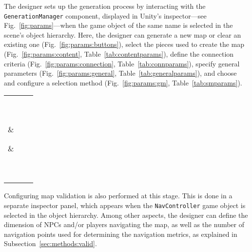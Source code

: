 \documentclass[journal]{IEEEtran}
\begin{document}
The designer sets up the generation process by interacting with the \texttt{GenerationManager}
component, displayed in Unity's inspector---see Fig.~\ref{fig:params}---when the game object of
the same name is selected in the scene's object hierarchy. Here, the designer can generate a new
map or clear an existing one (Fig.~\ref{fig:params:buttons}), select the pieces used to create
the map (Fig.~\ref{fig:params:content}, Table~\ref{tab:contentparams}), define the connection
criteria (Fig.~\ref{fig:params:connection}, Table~\ref{tab:connparams}), specify general
parameters (Fig.~\ref{fig:params:general}, Table~\ref{tab:generalparams}), and choose and
configure a selection method (Fig.~\ref{fig:params:gm}, Table~\ref{tab:smparams}).

\begin{figure*}[!t]
  \centering
  \begingroup
  \setlength{\tabcolsep}{1.5pt}
  \begin{tabular}{ccc}

   \parbox[c][][t]{0.326\textwidth}{
   \\
   }
   &
   \parbox[c][][t]{0.326\textwidth}{
   }
   &
   \parbox[c][][t]{0.326\textwidth}{
   \\
   }
  \end{tabular}
 \caption{The map generation parameters and control buttons, part of the
 \texttt{GenerationManager} component, as shown in Unity's inspector. The different
 generation parameter blocks, (b)--(e), essentially correspond to the parameters
 respectively presented in Tables~\ref{tab:contentparams}--\ref{tab:smparams}.
 More specifically, subfigures show:
 (a) the control buttons;
 (b) the content parameters;
 (c) the connection parameters;
 (d) the general parameters;
 and,
 (e) the selection method parameters (here exemplified for the case of the \textit{branch} selection method).}
 \label{fig:params}
 \endgroup
\end{figure*}

Configuring map validation is also performed at this stage. This is done in a separate inspector
panel, which appears when the \texttt{NavController} game object is selected in the object
hierarchy. Among other aspects, the designer can define the dimension of NPCs and/or players
navigating the map, as well as the number of navigation points used for determining the
navigation metrics, as explained in Subsection~\ref{sec:methods:valid}.
\end{document}
